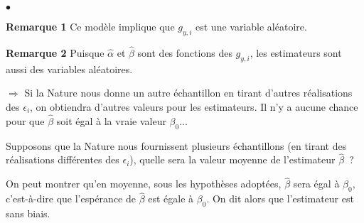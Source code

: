 \documentclass[10pt,notheorems]{beamer}
\theoremstyle{plain}
\theoremstyle{definition} %
\begin{document}
\begin{notes}
\begin{list}{$\bullet$}{}
    \item[\textbf{Remarque 1}] Ce modèle implique que $g_{y,i}$ est une variable
      aléatoire.\newline

    \item[\textbf{Remarque 2}] Puisque $\hat\alpha$ et $\hat\beta$ sont des
      fonctions des $g_{y,i}$, les estimateurs sont aussi des variables
      aléatoires.\newline

    \item[$\Rightarrow$] Si la Nature nous donne un autre échantillon en tirant
      d'autres réalisations des $\epsilon_i$, on obtiendra d'autres valeurs pour
      les estimateurs. Il n'y a aucune chance pour que $\hat\beta$ soit égal à
      la vraie valeur $\beta_0$...\newline

    \item Supposons que la Nature nous fournissent plusieurs échantillons (en
      tirant des réalisations différentes des $\epsilon_i$), quelle sera la
      valeur moyenne de l'estimateur $\hat\beta$~?\newline

    \item On peut montrer qu'en moyenne, sous les hypothèses adoptées,
      $\hat\beta$ sera égal à $\beta_0$, c'est-à-dire que l'espérance de
      $\hat\beta$ est égale à $\beta_0$. On dit alors que l'estimateur est sans
      biais.\newline


\end{list}
\end{notes}
\end{document}
